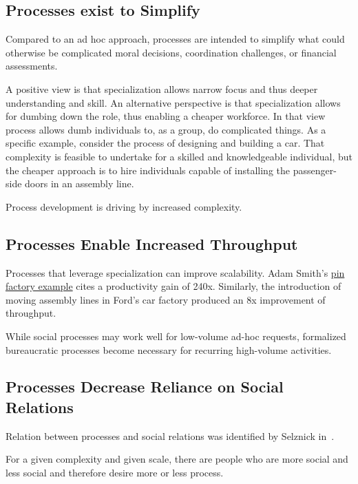 \subsection*{Processes exist to Simplify}
Compared to an ad hoc approach, processes are intended to simplify what could otherwise be complicated moral decisions, coordination challenges, or financial assessments. %



A positive view is that specialization allows narrow focus and thus deeper understanding and skill. An alternative perspective is that specialization allows for dumbing down the role, thus enabling a cheaper workforce. In that view process allows dumb individuals to, as a group, do complicated things.  As a specific example, consider the process of designing and building a car. That complexity is feasible to undertake for a skilled and knowledgeable individual, but the cheaper approach is to hire individuals capable of installing the passenger-side doors in an assembly line.

Process development is driving by increased complexity.

\subsection*{Processes Enable Increased Throughput}

Processes that leverage specialization can improve scalability. Adam Smith's \href{https://en.wikipedia.org/wiki/Business_process#Adam_Smith}{pin factory example} cites a productivity gain of 240x. Similarly, the introduction of moving assembly lines in Ford's car factory produced an 8x improvement of throughput. 

While social processes may work well for low-volume ad-hoc requests, formalized bureaucratic processes become necessary for recurring high-volume activities.

\subsection*{Processes Decrease Reliance on Social Relations}

Relation between processes and social relations was identified by Selznick in~\cite{1943_Selznick}.

For a given complexity and given scale, there are people who are more social and less social and therefore desire more or less process.

